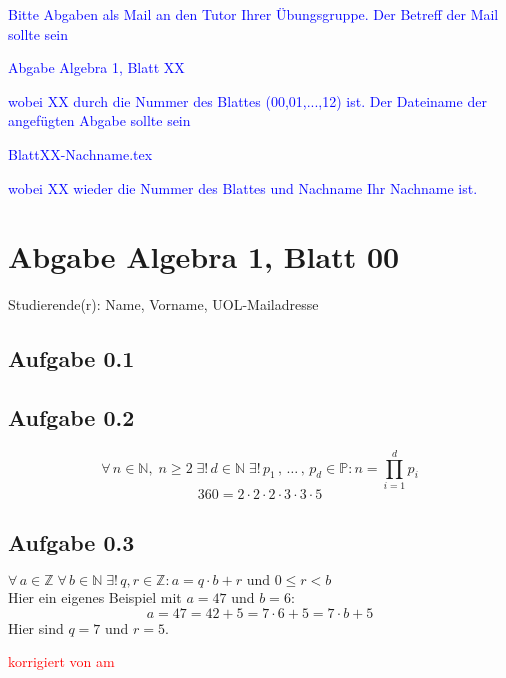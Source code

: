\documentclass[12pt]{article}
\newcommand{\corr}[1]{\textcolor{red}{#1}}%
\begin{document}
\textcolor{blue}{Bitte Abgaben als Mail an den Tutor Ihrer \"Ubungsgruppe. 
Der Betreff der Mail sollte sein   \\
\begin{center}
   Abgabe Algebra 1, Blatt XX  
\end{center}
wobei XX durch die Nummer des Blattes (00,01,...,12) ist. Der Dateiname der
angef\"ugten Abgabe sollte sein\\
\begin{center}
   BlattXX-Nachname.tex
\end{center}
wobei XX wieder die Nummer des Blattes und Nachname Ihr Nachname ist.}

\section*{Abgabe Algebra 1, Blatt 00}

Studierende(r): Name, Vorname, UOL-Mailadresse %

\subsection*{Aufgabe 0.1}  

\subsection*{Aufgabe 0.2}

$$\forall \, n \in \mathbb{N}, \; n\geq 2 \;\exists !\, d \in \mathbb{N}\; \exists !\, p_1 \, ,\, \ldots \, , \,p_d\in \mathbb{P}: n=\prod_{i=1}^{d} p_i$$
$$360 = 2 \cdot 2 \cdot 2 \cdot 3 \cdot 3 \cdot 5$$

\subsection*{Aufgabe 0.3}

$\forall \, a \in \mathbb{Z} \; \forall \, b \in \mathbb{N} \; \exists ! \, q,r \in \mathbb{Z}: a=q \cdot b + r \text{ und } 0 \leq r < b$ 
\medskip  \\
Hier ein eigenes Beispiel mit $a=47$ und $b=6$:
$$a=47=42+5=7 \cdot 6 + 5= 7 \cdot b + 5$$
Hier sind $q=7$ und $r=5$.\\






\bigskip

\corr{korrigiert von \hspace{1cm} am }
\end{document}
